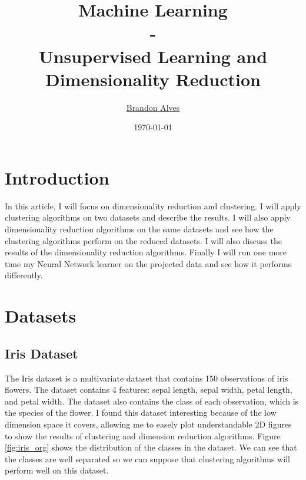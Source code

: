 \documentclass[twocolumn, 10pt]{article}
\title{
	Machine Learning
	\\-\\
	Unsupervised Learning and Dimensionality Reduction
}
\author{
	\href{mailto:brandon.alves@gatech.edu}{Brandon Alves}
}
\date{\today}
\begin{document}
	\maketitle
	\thispagestyle{empty}
	\tableofcontents
	\section{Introduction}
		In this article, I will focus on dimensionality reduction and clustering. I will apply clustering algorithms on two datasets and describe the results. I will also apply dimensionality reduction algorithms on the same datasets and see how the clustering algorithms perform on the reduced datasets. I will also discuss the results of the dimensionality reduction algorithms. Finally I will run one more time my Neural Network learner on the projected data and see how it performs differently.
	\section{Datasets}
		\subsection{Iris Dataset}
			The Iris dataset is a multivariate dataset that contains 150 observations of iris flowers. The dataset contains 4 features: sepal length, sepal width, petal length, and petal width. The dataset also contains the class of each observation, which is the species of the flower. I found this dataset interesting because of the low dimension space it covers, allowing me to easely plot understandable 2D figures to show the results of clustering and dimension reduction algorithms. Figure \ref{fig:iris_org} shows the distribution of the classes in the dataset. We can see that the classes are well separated so we can suppose that clustering algorithms will perform well on this dataset.
\end{document}
